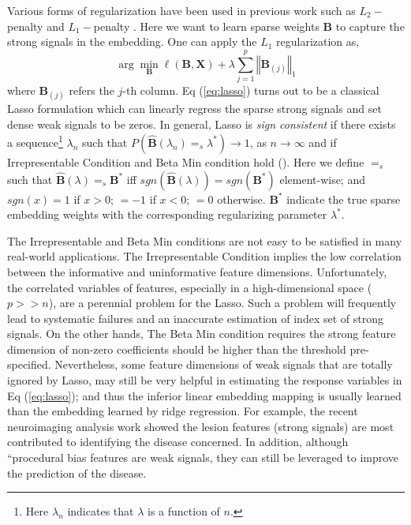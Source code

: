 \documentclass{article}
\begin{document}
\noindent Various forms of regularization have been used in previous
work such as $L_{2}-$penalty \citet{fu2016semi,romera2015embarrassingly}
and $L_{1}-$penalty \citet{kodirov2015unsupervised,wang2016relational}.
Here we want to learn sparse weights $\mathbf{B}$ to capture the
strong signals in the embedding. One can apply the $L_{1}$ regularization
as,
\begin{equation}
\arg\min_{\mathbf{B}}\ell(\mathbf{B},\mathbf{X})+\lambda\sum_{j=1}^{p}\left\Vert \mathbf{B}_{(j)}\right\Vert _{1}\label{eq:lasso}
\end{equation}
where $\mathbf{B}_{(j)}$ refers the $j$-th column. Eq (\ref{eq:lasso})
turns out to be a classical Lasso formulation which can linearly regress
the sparse strong signals and set dense weak signals to be zeros.
In general, Lasso is \emph{sign consistent} if there exists a sequence\footnote{Here $\lambda_{n}$ indicates that $\lambda$ is a function of $n$.}{ $\lambda_{n}$ such that $P\left(\hat{\mathbf{B}}\left(\lambda_{n}\right)=_{s}\lambda^{*}\right)\rightarrow1$,
as $n\rightarrow\infty$} and if Irrepresentable Condition and Beta
Min condition hold (\citet{FanLi01,sharp_lasso,zhao2006model}). Here
we define $=_{s}$ such that $\hat{\mathbf{B}}\left(\lambda\right)=_{s}\mathbf{B}^{*}$
iff $sgn\left(\hat{\mathbf{B}}\left(\lambda\right)\right)=sgn\left(\mathbf{B}^{*}\right)$
element-wise; and {$sgn\left(x\right) = 1$ if $x > 0$; $= -1$ if $x < 0$; $= 0$ otherwise.}
$\mathbf{B}^{*}$ indicate the true sparse embedding weights with
the corresponding regularizing parameter $\lambda^{*}$.


The Irrepresentable and Beta Min conditions are not easy to be satisfied
in many real-world applications. The Irrepresentable Condition implies
the low correlation between the informative and uninformative feature
dimensions. Unfortunately, the correlated variables of features, especially
in a high-dimensional space ($p>>n$), are a perennial problem for
the Lasso. Such a problem will frequently lead to systematic failures
and an inaccurate estimation of index set of strong signals. On the
other hands, The Beta Min condition requires the strong feature dimension
of non-zero coefficients should be higher than the threshold pre-specified.
Nevertheless, some feature dimensions of weak signals that are totally
ignored by Lasso, may still be very helpful in estimating the response
variables in Eq (\ref{eq:lasso}); and thus the inferior linear embedding
mapping is usually learned than the embedding learned by ridge regression.
For example, the recent neuroimaging analysis work \citet{sun2017gsplit}
showed the lesion features (strong signals) are most contributed to
identifying the disease concerned. In addition, although ``procedural
bias\textquotedbl{} features are weak signals, they can still be leveraged
to improve the prediction of the disease.
\end{document}
